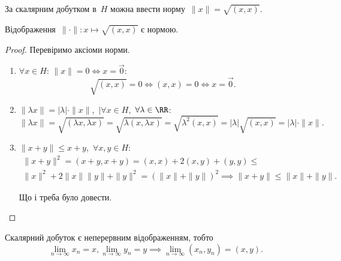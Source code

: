 За скалярним добутком в~$H$ можна ввести норму~$\|x\| = \sqrt{(x, x)}$.

\begin{lemma}
Відображення~$\|\cdot\|: x \mapsto \sqrt{(x, x)}$ є нормою.
\end{lemma}

\begin{proof}
Перевіримо аксіоми норми.
\begin{enumerate}
\item $\forall x \in H$: $\|x\| = 0 \iff x = \vec 0$:
\begin{equation*}
    \sqrt{(x, x)} = 0 \iff (x, x) = 0 \iff x = \vec 0.
\end{equation*}

\item $\|\lambda x\| = |\lambda| \cdot \|x\|$,~$|\forall x \in H$,~$\forall \lambda \in \RR$:
\begin{equation*}
    \|\lambda x\| =
    \sqrt{(\lambda x, \lambda x)} =
    \sqrt{\lambda (x, \lambda x)} =
    \sqrt{\lambda^2 (x, x)} =
    |\lambda| \sqrt{(x, x)} =
    |\lambda| \cdot \|x\|.
\end{equation*}

\item $\|x + y\| \le x + y$,~$\forall x, y \in H$:
\begin{multline*}
    \|x + y\|^2 = (x + y, x + y) =
    (x, x) + 2 (x, y) + (y, y) \le \\
    \|x\|^2 + 2 \|x\| \|y\| + \|y\|^2 =
    (\|x\| + \|y\|)^2 \implies
    \|x + y\| \le \|x\| + \|y\|.
\end{multline*}

Що і треба було довести. \qedhere
\end{enumerate}
\end{proof}

\begin{lemma}
Скалярний добуток є неперервним
відображенням, тобто
\begin{equation*}
    \lim_{n \to \infty} x_n = x,
    \lim_{n \to \infty} y_n = y \implies
    \lim_{n \to \infty} (x_n, y_n) = (x, y).
\end{equation*}
\end{lemma}

